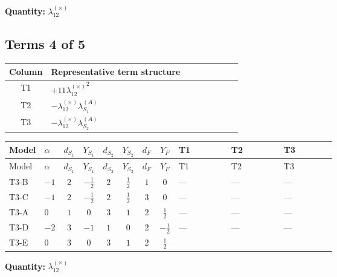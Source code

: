 \documentclass[8pt]{article}
\begin{document}
\begin{landscape}
\begin{longtable}{@{}llcccccc >{\raggedright\arraybackslash}p{0.21\linewidth} >{\raggedright\arraybackslash}p{0.21\linewidth} >{\raggedright\arraybackslash}p{0.21\linewidth}@{}}
\midrule
\bottomrule
\end{longtable}
\clearpage
\noindent\textbf{Quantity: }$\lambda_{12}^{(\times)}$\par\smallskip
\subsection*{Terms 4 of 5}
\begin{center}
\begin{tabular}{@{}c >{\raggedright\arraybackslash}p{0.82\linewidth}@{}}
\toprule
Column & Representative term structure \\
\midrule
T1 & \(\displaystyle +11 {\lambda_{12}^{(\times)}}^2\) \\
\midrule
T2 & \(\displaystyle -{\lambda_{12}^{(\times)}} {\lambda_{S_1}^{(A)}}\) \\
\midrule
T3 & \(\displaystyle -{\lambda_{12}^{(\times)}} {\lambda_{S_2}^{(A)}}\) \\
\midrule
\bottomrule
\end{tabular}
\end{center}
\smallskip
\tiny
\begin{longtable}{@{}llcccccc >{\raggedright\arraybackslash}p{0.21\linewidth} >{\raggedright\arraybackslash}p{0.21\linewidth} >{\raggedright\arraybackslash}p{0.21\linewidth}@{}}
\toprule
Model & $\alpha$ & $d_{S_1}$ & $Y_{S_1}$ & $d_{S_2}$ & $Y_{S_2}$ & $d_F$ & $Y_F$ & T1 & T2 & T3 \\
\midrule
\endfirsthead
\toprule
Model & $\alpha$ & $d_{S_1}$ & $Y_{S_1}$ & $d_{S_2}$ & $Y_{S_2}$ & $d_F$ & $Y_F$ & T1 & T2 & T3 \\
\midrule
\endhead
T3-B & $-1$ & $2$ & $-\frac{1}{2}$ & $2$ & $\frac{1}{2}$ & $1$ & $0$ & --- & --- & --- \\
\midrule
T3-C & $-1$ & $2$ & $-\frac{1}{2}$ & $2$ & $\frac{1}{2}$ & $3$ & $0$ & --- & --- & --- \\
\midrule
T3-A & $0$ & $1$ & $0$ & $3$ & $1$ & $2$ & $\frac{1}{2}$ & --- & --- & --- \\
\midrule
T3-D & $-2$ & $3$ & $-1$ & $1$ & $0$ & $2$ & $-\frac{1}{2}$ & --- & --- & --- \\
\midrule
T3-E & $0$ & $3$ & $0$ & $3$ & $1$ & $2$ & $\frac{1}{2}$ & \scriptsize\adjustbox{max width=\linewidth}{$\begin{gathered} +11 {\lambda_{12}^{(\times)}}^2\end{gathered}$} & \scriptsize\adjustbox{max width=\linewidth}{$\begin{gathered} -{\lambda_{12}^{(\times)}} {\lambda_{S_1}^{(A)}}\end{gathered}$} & \scriptsize\adjustbox{max width=\linewidth}{$\begin{gathered} -{\lambda_{12}^{(\times)}} {\lambda_{S_2}^{(A)}}\end{gathered}$} \\
\midrule
\bottomrule
\end{longtable}
\clearpage
\noindent\textbf{Quantity: }$\lambda_{12}^{(\times)}$\par\smallskip

\end{landscape}
\end{document}

